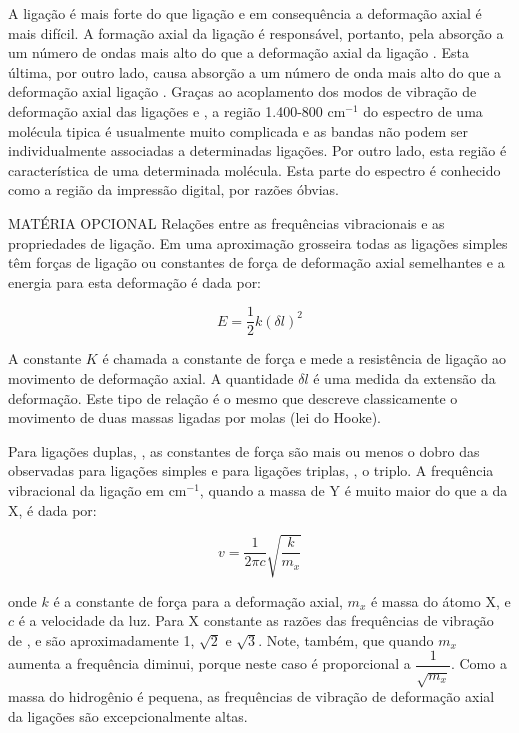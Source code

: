 A ligação  é mais forte do que ligação  e em consequência a deformação axial é mais difícil. A formação axial da ligação  é responsável, portanto, pela absorção a um número de ondas mais alto do que a deformação axial da ligação . Esta última, por outro lado, causa absorção a um número de onda mais alto do que a deformação axial ligação . Graças ao acoplamento dos modos de vibração de deformação axial das ligações  e , a região 1.400-800 cm$^{-1}$ do espectro de uma molécula tipica é usualmente muito complicada e as bandas não podem ser individualmente associadas a determinadas ligações. Por outro lado, esta região é característica de uma determinada molécula. Esta parte do espectro é conhecido como a região da impressão digital, por razões óbvias.

\noindent MATÉRIA OPCIONAL
Relações entre as frequências vibracionais e as propriedades de ligação. Em uma aproximação grosseira todas as ligações simples têm forças de ligação ou constantes de força de deformação axial semelhantes e a energia para esta deformação é dada por:

\begin{equation}
    E = \dfrac{1}{2}k(\delta l )^2
\end{equation}

A constante $K$ é chamada a constante de força e mede a resistência de ligação ao movimento de deformação axial. A quantidade $\delta l$ é uma medida da extensão da deformação. Este tipo de relação é o mesmo que descreve classicamente o movimento de duas massas ligadas por molas (lei do Hooke).

Para ligações duplas, , as constantes de força são mais ou menos o dobro das observadas para ligações simples e para ligações triplas, , o triplo. A frequência vibracional da ligação  em cm$^{-1}$, quando a massa de Y é muito maior do que a da X, é dada por:

\begin{equation}
    v = \dfrac{1}{2 \pi c}\sqrt{\dfrac{k}{m_x}}
\end{equation}

\noindent onde $k$ é a constante de força para a deformação axial, $m_x$ é massa do átomo X, e $c$ é a velocidade da luz. Para X constante as razões das frequências de vibração de ,  e  são aproximadamente 1, $\sqrt{2}$ e $\sqrt{3}$. Note, também, que quando $m_x$ aumenta a frequência diminui, porque neste caso é proporcional a $\dfrac{1}{\sqrt{m_x}}$. Como a massa do hidrogênio é pequena, as frequências de vibração de deformação axial da ligações  são excepcionalmente altas.

